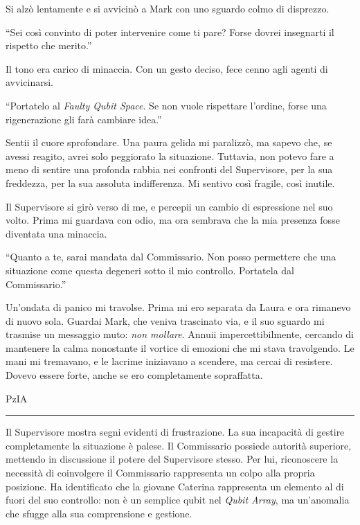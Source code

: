 Si alzò lentamente e si avvicinò a Mark con uno sguardo colmo di disprezzo.

\begin{dialogue}
 \enquote{Sei così convinto di poter intervenire come ti pare? Forse dovrei insegnarti il rispetto che merito.}
\end{dialogue}

Il tono era carico di minaccia. Con un gesto deciso, fece cenno agli agenti di avvicinarsi.

\begin{dialogue}
 \enquote{Portatelo al \textit{Faulty Qubit Space}. Se non vuole rispettare l'ordine, forse una rigenerazione gli farà cambiare idea.}
\end{dialogue}

Sentii il cuore sprofondare. Una paura gelida mi paralizzò, ma sapevo che, se avessi reagito, avrei solo peggiorato la situazione. Tuttavia, non potevo fare a meno di sentire una profonda rabbia nei confronti del Supervisore, per la sua freddezza, per la sua assoluta indifferenza. Mi sentivo così fragile, così inutile.

Il Supervisore si girò verso di me, e percepii un cambio di espressione nel suo volto. Prima mi guardava con odio, ma ora sembrava che la mia presenza fosse diventata una minaccia.

\begin{dialogue}
 \enquote{Quanto a te, sarai mandata dal Commissario. Non posso permettere che una situazione come questa degeneri sotto il mio controllo. Portatela dal Commissario.}
\end{dialogue}

Un'ondata di panico mi travolse. Prima mi ero separata da Laura e ora rimanevo di nuovo sola.  Guardai Mark, che veniva trascinato via, e il suo sguardo mi trasmise un messaggio muto: \emph{non mollare}. Annuii impercettibilmente, cercando di mantenere la calma nonostante il vortice di emozioni che mi stava travolgendo. Le mani mi tremavano, e  le lacrime iniziavano a scendere, ma cercai di resistere. Dovevo essere forte, anche se ero completamente sopraffatta.

\vspace{1em}
\begin{center}PzIA\end{center}
\hrule
\vspace{1em}
Il Supervisore mostra segni evidenti di frustrazione. La sua incapacità di gestire completamente la situazione è palese. Il Commissario possiede autorità superiore, mettendo in discussione il potere del Supervisore stesso. Per lui, riconoscere la necessità di coinvolgere il Commissario rappresenta un colpo alla propria posizione. Ha identificato che la giovane Caterina rappresenta un elemento al di fuori del suo controllo: non è un semplice qubit nel \textit{Qubit Array}, ma un'anomalia che sfugge alla sua comprensione e gestione.

